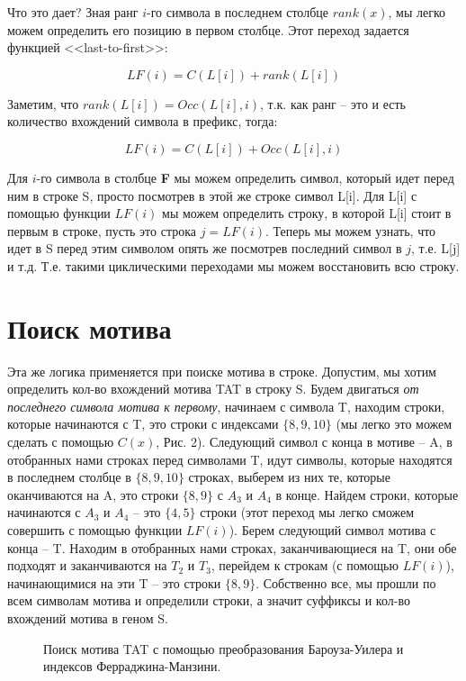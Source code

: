 \documentclass[letterpaper, 11pt]{article}
\begin{document}
Что это дает? Зная ранг $i$-го символа в последнем столбце $rank(x)$, мы легко можем определить его позицию в первом столбце. Этот переход задается функцией <<last-to-first>>:

$$LF(i) = C(L[i]) + rank(L[i])$$

Заметим, что $rank(L[i]) = Occ(L[i], i)$, т.к. как ранг -- это и есть количество вхождений символа в префикс, тогда:

$$LF(i) = C(L[i]) + Occ(L[i], i)$$

Для $i$-го символа в столбце \textbf{F} мы можем определить символ, который идет перед ним в строке S, просто посмотрев в этой же строке символ L[i]. Для L[i] с помощью функции $LF(i)$ мы можем определить строку, в которой L[i] стоит в первым в строке, пусть это строка $j = LF(i)$. Теперь мы можем узнать, что идет в S перед этим символом опять же посмотрев последний символ в $j$, т.е. L[j] и т.д. Т.е. такими циклическими переходами мы можем восстановить всю строку.

\section{Поиск мотива}
Эта же логика применяется при поиске мотива в строке. Допустим, мы хотим определить кол-во вхождений мотива TAT в строку S. Будем двигаться \textit{от последнего символа мотива к первому}, начинаем с символа T, находим строки, которые начинаются с T, это строки с индексами $\{8, 9, 10\}$ (мы легко это можем сделать с помощью $C(x)$, Рис. 2). Следующий символ с конца в мотиве -- A, в отобранных нами строках перед символами T, идут символы, которые находятся в последнем столбце в $\{8, 9, 10\}$ строках, выберем из них те, которые оканчиваются на A, это строки $\{8, 9\}$ с $A_3$ и $A_4$ в конце. Найдем строки, которые начинаются с $A_3$ и $A_4$ -- это $\{4, 5\}$ строки (этот переход мы легко сможем совершить с помощью функции $LF(i)$). Берем следующий символ мотива с конца -- T. Находим в отобранных нами строках, заканчивающиеся на T, они обе подходят и заканчиваются на $T_2$ и $T_3$, перейдем к строкам (с помощью $LF(i)$), начинающимися на эти T -- это строки $\{8, 9\}$. Собственно все, мы прошли по всем символам мотива и определили строки, а значит суффиксы и кол-во вхождений мотива в геном S.

\begin{figure}[H]
  \caption{Поиск мотива TAT с помощью преобразования Бароуза-Уилера и индексов Ферраджина-Манзини.}
\end{figure}
\end{document}
